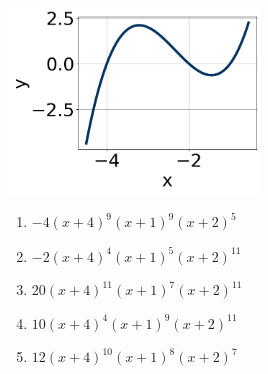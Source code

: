 \documentclass[14pt]{extbook}
\begin{document}
\begin{enumerate}
{\begin{center}
    \includegraphics[width=0.5\textwidth]{../Figures/polyGraphToFunctionA.png}
\end{center}
\begin{enumerate}[label=\Alph*.]
\item \( -4(x + 4)^{9} (x + 1)^{9} (x + 2)^{5} \)
\item \( -2(x + 4)^{4} (x + 1)^{5} (x + 2)^{11} \)
\item \( 20(x + 4)^{11} (x + 1)^{7} (x + 2)^{11} \)
\item \( 10(x + 4)^{4} (x + 1)^{9} (x + 2)^{11} \)
\item \( 12(x + 4)^{10} (x + 1)^{8} (x + 2)^{7} \)


\end{enumerate}}
\end{enumerate}
\end{document}
